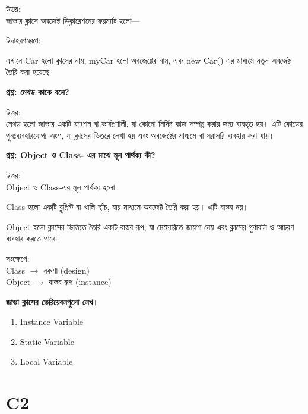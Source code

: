 \documentclass[12pt]{article}
\begin{document}
উত্তর:  \\
জাভার ক্লাসে অবজেক্ট ডিক্লারেশনের ফরম্যাট হলো—


উদাহরণস্বরূপ:


এখানে Car হলো ক্লাসের নাম, myCar হলো অবজেক্টের নাম, এবং new Car() এর মাধ্যমে নতুন অবজেক্ট তৈরি করা হয়েছে।

\vspace{0.5em}
\textbf{প্রশ্ন: মেথড কাকে বলে?}

উত্তর:  \\
মেথড হলো জাভার একটি ফাংশন বা কার্যপ্রণালী, যা কোনো নির্দিষ্ট কাজ সম্পন্ন করার জন্য ব্যবহৃত হয়। এটি কোডের পুনঃব্যবহারযোগ্য অংশ, যা ক্লাসের ভিতরে লেখা হয় এবং অবজেক্টের মাধ্যমে বা সরাসরি ব্যবহার করা যায়।

\vspace{0.5em}
\textbf{প্রশ্ন: Object ও Class- এর মাঝে মূল পার্থক্য কী?}

উত্তর:  \\
Object ও Class-এর মূল পার্থক্য হলো:

Class হলো একটি ব্লুপ্রিন্ট বা খালি ছাঁচ, যার মাধ্যমে অবজেক্ট তৈরি করা হয়। এটি বাস্তব নয়।

Object হলো ক্লাসের ভিত্তিতে তৈরি একটি বাস্তব রূপ, যা মেমোরিতে জায়গা নেয় এবং ক্লাসের গুণাবলি ও আচরণ ব্যবহার করতে পারে।

সংক্ষেপে:  \\
Class $\rightarrow$ নকশা (design)  \\
Object $\rightarrow$ বাস্তব রূপ (instance)

\vspace{0.5em}
\textbf{জাভা ক্লাসের ভেরিয়েবলগুলো লেখ।}

\begin{enumerate}[label=\arabic*.]
    \item Instance Variable
    \item Static Variable
    \item Local Variable
\end{enumerate}

\section*{C2}
\end{document}
